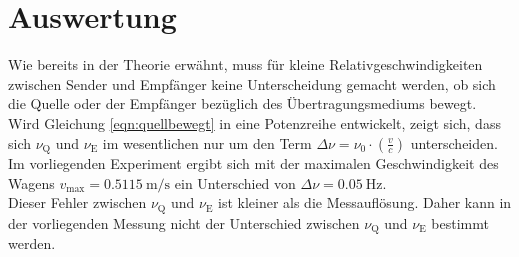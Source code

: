 \section{Auswertung}
\label{sec:Auswertung}
\FloatBarrier
Wie bereits in der Theorie erwähnt, muss für kleine Relativgeschwindigkeiten zwischen Sender und Empfänger keine Unterscheidung gemacht werden, ob sich die Quelle oder der Empfänger bezüglich des Übertragungsmediums bewegt.\\
Wird Gleichung \eqref{eqn:quellbewegt} in eine Potenzreihe entwickelt, zeigt sich, dass sich $\nu_{\mathrm{Q}}$ und $\nu_{\mathrm{E}}$ im wesentlichen nur um den Term $\Delta \nu=\nu_{\mathrm{0}} \cdot \left(\frac{v}{c}\right)$ unterscheiden.\\
Im vorliegenden Experiment ergibt sich mit der maximalen Geschwindigkeit des Wagens $v_{\mathrm{max}}=\SI{0.5115}{\meter\per\second}$ ein Unterschied von $\Delta \nu=\SI{0.05}{\Hz}$.\\
Dieser Fehler zwischen $\nu_{\mathrm{Q}}$ und $\nu_{\mathrm{E}}$ ist kleiner als die Messauflösung. Daher kann in der vorliegenden Messung nicht der Unterschied zwischen $\nu_{\mathrm{Q}}$ und $\nu_{\mathrm{E}}$ bestimmt werden.\\

